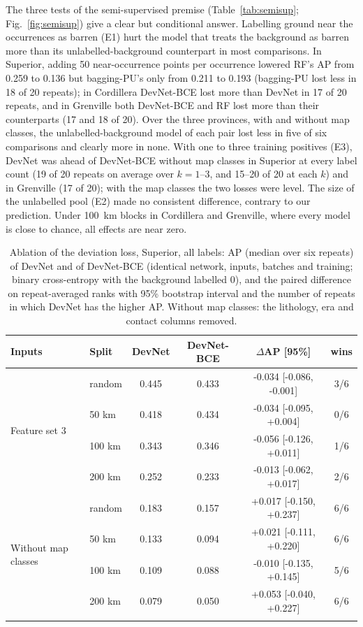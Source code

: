 \documentclass[pdflatex,sn-apa]{sn-jnl}
\begin{document}
The three tests of the semi-supervised premise (Table~\ref{tab:semisup}; Fig.~\ref{fig:semisup}) give a clear but conditional answer. Labelling ground near the occurrences as barren (E1) hurt the model that treats the background as barren more than its unlabelled-background counterpart in most comparisons. In Superior, adding 50 near-occurrence points per occurrence lowered RF's AP from 0.259 to 0.136 but bagging-PU's only from 0.211 to 0.193 (bagging-PU lost less in 18 of 20 repeats); in Cordillera DevNet-BCE lost more than DevNet in 17 of 20 repeats, and in Grenville both DevNet-BCE and RF lost more than their counterparts (17 and 18 of 20). Over the three provinces, with and without map classes, the unlabelled-background model of each pair lost less in five of six comparisons and clearly more in none. With one to three training positives (E3), DevNet was ahead of DevNet-BCE without map classes in Superior at every label count (19 of 20 repeats on average over $k = 1$--3, and 15--20 of 20 at each $k$) and in Grenville (17 of 20); with the map classes the two losses were level. The size of the unlabelled pool (E2) made no consistent difference, contrary to our prediction. Under 100~km blocks in Cordillera and Grenville, where every model is close to chance, all effects are near zero.

\begin{table}[t]
\caption{Ablation of the deviation loss, Superior, all labels: AP (median over six repeats) of DevNet and of DevNet-BCE (identical network, inputs, batches and training; binary cross-entropy with the background labelled 0), and the paired difference on repeat-averaged ranks with 95\% bootstrap interval and the number of repeats in which DevNet has the higher AP. Without map classes: the lithology, era and contact columns removed.}\label{tab:loss-ablation}
\footnotesize
\setlength{\tabcolsep}{3pt}
\begin{tabular*}{\textwidth}{@{\extracolsep\fill}llcccc}
\toprule
Inputs & Split & DevNet & DevNet-BCE & $\Delta$AP [95\%] & wins \\
\midrule
\multirow{4}{*}{Feature set 3} & random & 0.445 & 0.433 & -0.034 [-0.086, -0.001] & 3/6 \\
 & 50 km & 0.418 & 0.434 & -0.034 [-0.095, +0.004] & 0/6 \\
 & 100 km & 0.343 & 0.346 & -0.056 [-0.126, +0.011] & 1/6 \\
 & 200 km & 0.252 & 0.233 & -0.013 [-0.062, +0.017] & 2/6 \\
\midrule
\multirow{4}{*}{Without map classes} & random & 0.183 & 0.157 & +0.017 [-0.150, +0.237] & 6/6 \\
 & 50 km & 0.133 & 0.094 & +0.021 [-0.111, +0.220] & 6/6 \\
 & 100 km & 0.109 & 0.088 & -0.010 [-0.135, +0.145] & 5/6 \\
 & 200 km & 0.079 & 0.050 & +0.053 [-0.040, +0.227] & 6/6 \\
\botrule
\end{tabular*}
\end{table}
\end{document}
